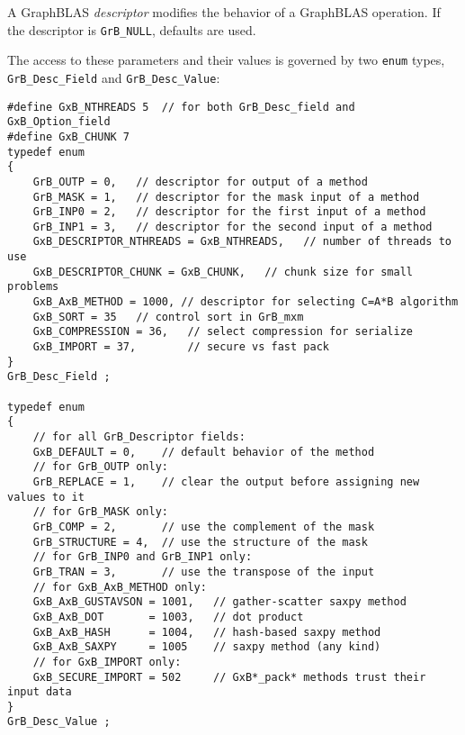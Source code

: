 \documentclass[12pt]{article}
\begin{document}
A GraphBLAS {\em descriptor} modifies the behavior of a GraphBLAS operation.
If the descriptor is \verb'GrB_NULL', defaults are used.

The access to these parameters and their values is governed
by two \verb'enum' types, \verb'GrB_Desc_Field' and \verb'GrB_Desc_Value':

\begin{mdframed}[userdefinedwidth=6in]
{\footnotesize
\begin{verbatim}
#define GxB_NTHREADS 5  // for both GrB_Desc_field and GxB_Option_field
#define GxB_CHUNK 7
typedef enum
{
    GrB_OUTP = 0,   // descriptor for output of a method
    GrB_MASK = 1,   // descriptor for the mask input of a method
    GrB_INP0 = 2,   // descriptor for the first input of a method
    GrB_INP1 = 3,   // descriptor for the second input of a method
    GxB_DESCRIPTOR_NTHREADS = GxB_NTHREADS,   // number of threads to use
    GxB_DESCRIPTOR_CHUNK = GxB_CHUNK,   // chunk size for small problems
    GxB_AxB_METHOD = 1000, // descriptor for selecting C=A*B algorithm
    GxB_SORT = 35   // control sort in GrB_mxm
    GxB_COMPRESSION = 36,   // select compression for serialize
    GxB_IMPORT = 37,        // secure vs fast pack
}
GrB_Desc_Field ;

typedef enum
{
    // for all GrB_Descriptor fields:
    GxB_DEFAULT = 0,    // default behavior of the method
    // for GrB_OUTP only:
    GrB_REPLACE = 1,    // clear the output before assigning new values to it
    // for GrB_MASK only:
    GrB_COMP = 2,       // use the complement of the mask
    GrB_STRUCTURE = 4,  // use the structure of the mask
    // for GrB_INP0 and GrB_INP1 only:
    GrB_TRAN = 3,       // use the transpose of the input
    // for GxB_AxB_METHOD only:
    GxB_AxB_GUSTAVSON = 1001,   // gather-scatter saxpy method
    GxB_AxB_DOT       = 1003,   // dot product
    GxB_AxB_HASH      = 1004,   // hash-based saxpy method
    GxB_AxB_SAXPY     = 1005    // saxpy method (any kind)
    // for GxB_IMPORT only:
    GxB_SECURE_IMPORT = 502     // GxB*_pack* methods trust their input data
}
GrB_Desc_Value ;
\end{verbatim} } \end{mdframed}

\newpage
\end{document}
